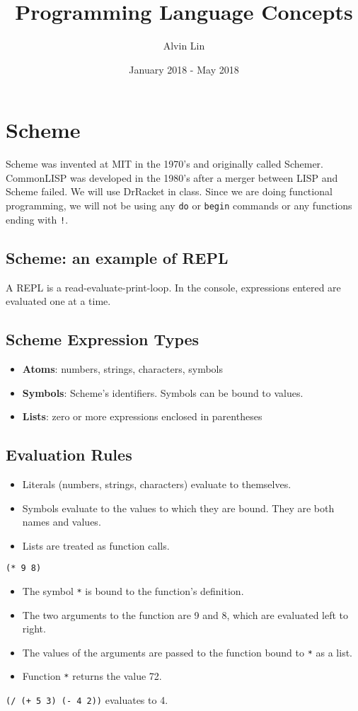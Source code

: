 \documentclass{math}
\title{Programming Language Concepts}
\author{Alvin Lin}
\date{January 2018 - May 2018}
\begin{document}
\maketitle

\section*{Scheme}
Scheme was invented at MIT in the 1970's and originally called Schemer.
CommonLISP was developed in the 1980's after a merger between LISP and Scheme
failed. We will use DrRacket in class. Since we are doing functional
programming, we will not be using any \texttt{do} or \texttt{begin} commands or
any functions ending with \texttt{!}.

\subsection*{Scheme: an example of REPL}
A REPL is a read-evaluate-print-loop. In the console, expressions entered are
evaluated one at a time.

\subsection*{Scheme Expression Types}
\begin{itemize}
  \item \textbf{Atoms}: numbers, strings, characters, symbols
  \item \textbf{Symbols}: Scheme's identifiers. Symbols can be bound to values.
  \item \textbf{Lists}: zero or more expressions enclosed in parentheses
\end{itemize}

\subsection*{Evaluation Rules}
\begin{itemize}
  \item Literals (numbers, strings, characters) evaluate to themselves.
  \item Symbols evaluate to the values to which they are bound. They are both
  names and values.
  \item Lists are treated as function calls.
\end{itemize}
\texttt{(* 9 8)}
\begin{itemize}
  \item The symbol \texttt{*} is bound to the function's definition.
  \item The two arguments to the function are 9 and 8, which are evaluated left
  to right.
  \item The values of the arguments are passed to the function bound to
  \texttt{*} as a list.
  \item Function \texttt{*} returns the value 72.
\end{itemize}
\texttt{(/ (+ 5 3) (- 4 2))} evaluates to 4.
\end{document}
